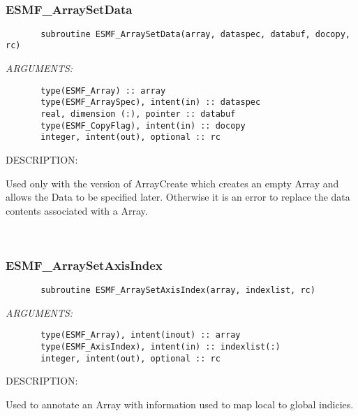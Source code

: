 \mbox{}\hrulefill\ 
 
\subsubsection [ESMF\_ArraySetData] {ESMF\_ArraySetData}


  
\begin{verbatim}       subroutine ESMF_ArraySetData(array, dataspec, databuf, docopy, rc)\end{verbatim}{\em ARGUMENTS:}
\begin{verbatim}       type(ESMF_Array) :: array
       type(ESMF_ArraySpec), intent(in) :: dataspec
       real, dimension (:), pointer :: databuf
       type(ESMF_CopyFlag), intent(in) :: docopy
       integer, intent(out), optional :: rc\end{verbatim}
{\sf DESCRIPTION:\\ }


   Used only with the version of ArrayCreate which creates an empty
   Array and allows the Data to be specified later. Otherwise it is an
   error to replace the data contents associated with a Array.
   
 
\mbox{}\hrulefill\ 
 
\subsubsection [ESMF\_ArraySetAxisIndex] {ESMF\_ArraySetAxisIndex}


  
\begin{verbatim}       subroutine ESMF_ArraySetAxisIndex(array, indexlist, rc)\end{verbatim}{\em ARGUMENTS:}
\begin{verbatim}       type(ESMF_Array), intent(inout) :: array
       type(ESMF_AxisIndex), intent(in) :: indexlist(:)
       integer, intent(out), optional :: rc\end{verbatim}
{\sf DESCRIPTION:\\ }


   Used to annotate an Array with information used to map local to global
   indicies.
   
 
\mbox{}\hrulefill\ 
 
